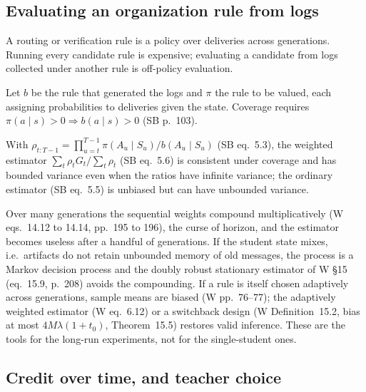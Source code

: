 \documentclass[11pt]{article}
\numberwithin{theorem}{section}
\theoremstyle{definition}
\theoremstyle{problemstyle}
\begin{document}
\subsection{Evaluating an organization rule from logs}

A routing or verification rule is a policy over deliveries across generations. Running every candidate rule is
expensive; evaluating a candidate from logs collected under another rule is off-policy evaluation.

\begin{definition}
Let $b$ be the rule that generated the logs and $\pi$ the rule to be valued, each assigning probabilities to deliveries
given the state. Coverage requires $\pi(a\mid s)>0 \Rightarrow b(a\mid s)>0$ (SB p.~103).
\end{definition}

\begin{prop}
With $\rho_{t:T-1}=\prod_{u=t}^{T-1}\pi(A_u\mid S_u)/b(A_u\mid S_u)$ (SB eq.~5.3), the weighted estimator
$\sum_t \rho_t G_t/\sum_t\rho_t$ (SB eq.~5.6) is consistent under coverage and has bounded variance even when the
ratios have infinite variance; the ordinary estimator (SB eq.~5.5) is unbiased but can have unbounded variance.
\end{prop}

\begin{remark}
Over many generations the sequential weights compound multiplicatively (W eqs.\ 14.12 to 14.14, pp.~195 to 196),
the curse of horizon, and the estimator becomes useless after a handful of generations. If the student state mixes, i.e.\
artifacts do not retain unbounded memory of old messages, the process is a Markov decision process and the doubly
robust stationary estimator of W \S15 (eq.~15.9, p.~208) avoids the compounding. If a rule is itself chosen
adaptively across generations, sample means are biased (W pp.~76--77); the adaptively weighted estimator (W eq.~6.12)
or a switchback design (W Definition~15.2, bias at most $4M\lambda(1+t_0)$, Theorem~15.5) restores valid inference.
These are the tools for the long-run experiments, not for the single-student ones.
\end{remark}

\subsection{Credit over time, and teacher choice}
\end{document}
